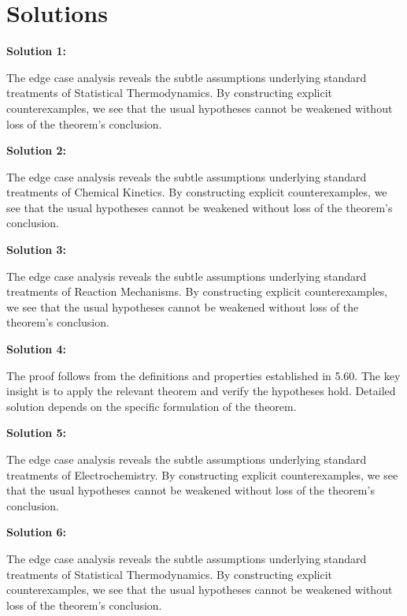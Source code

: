 \documentclass[12pt,a4paper]{exam}
\begin{document}
\newpage
\section*{Solutions}

\textbf{Solution 1:}

The edge case analysis reveals the subtle assumptions underlying standard treatments of Statistical Thermodynamics. By constructing explicit counterexamples, we see that the usual hypotheses cannot be weakened without loss of the theorem's conclusion.

\vspace{0.5cm}

\textbf{Solution 2:}

The edge case analysis reveals the subtle assumptions underlying standard treatments of Chemical Kinetics. By constructing explicit counterexamples, we see that the usual hypotheses cannot be weakened without loss of the theorem's conclusion.

\vspace{0.5cm}

\textbf{Solution 3:}

The edge case analysis reveals the subtle assumptions underlying standard treatments of Reaction Mechanisms. By constructing explicit counterexamples, we see that the usual hypotheses cannot be weakened without loss of the theorem's conclusion.

\vspace{0.5cm}

\textbf{Solution 4:}

The proof follows from the definitions and properties established in 5.60. The key insight is to apply the relevant theorem and verify the hypotheses hold. Detailed solution depends on the specific formulation of the theorem.

\vspace{0.5cm}

\textbf{Solution 5:}

The edge case analysis reveals the subtle assumptions underlying standard treatments of Electrochemistry. By constructing explicit counterexamples, we see that the usual hypotheses cannot be weakened without loss of the theorem's conclusion.

\vspace{0.5cm}

\textbf{Solution 6:}

The edge case analysis reveals the subtle assumptions underlying standard treatments of Statistical Thermodynamics. By constructing explicit counterexamples, we see that the usual hypotheses cannot be weakened without loss of the theorem's conclusion.
\end{document}
